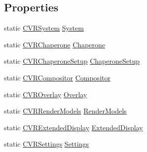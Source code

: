 \subsection*{Properties}
\begin{DoxyCompactItemize}
\item 
static \mbox{\hyperlink{class_valve_1_1_v_r_1_1_c_v_r_system}{C\+V\+R\+System}} \mbox{\hyperlink{class_valve_1_1_v_r_1_1_open_v_r_a6aafa4a25425620225098ded82a045c0}{System}}
\item 
static \mbox{\hyperlink{class_valve_1_1_v_r_1_1_c_v_r_chaperone}{C\+V\+R\+Chaperone}} \mbox{\hyperlink{class_valve_1_1_v_r_1_1_open_v_r_a28a1938fe526eed643dfc0be4d16be1e}{Chaperone}}
\item 
static \mbox{\hyperlink{class_valve_1_1_v_r_1_1_c_v_r_chaperone_setup}{C\+V\+R\+Chaperone\+Setup}} \mbox{\hyperlink{class_valve_1_1_v_r_1_1_open_v_r_aebaf4a6bd9c7d3831c0210c4af1764b4}{Chaperone\+Setup}}
\item 
static \mbox{\hyperlink{class_valve_1_1_v_r_1_1_c_v_r_compositor}{C\+V\+R\+Compositor}} \mbox{\hyperlink{class_valve_1_1_v_r_1_1_open_v_r_a398bc817d8516416f480aed933599ac5}{Compositor}}
\item 
static \mbox{\hyperlink{class_valve_1_1_v_r_1_1_c_v_r_overlay}{C\+V\+R\+Overlay}} \mbox{\hyperlink{class_valve_1_1_v_r_1_1_open_v_r_a03223e58125dbd40477879c4283728a3}{Overlay}}
\item 
static \mbox{\hyperlink{class_valve_1_1_v_r_1_1_c_v_r_render_models}{C\+V\+R\+Render\+Models}} \mbox{\hyperlink{class_valve_1_1_v_r_1_1_open_v_r_a8edbc1c20720ae5911e5e6c29221b9b5}{Render\+Models}}
\item 
static \mbox{\hyperlink{class_valve_1_1_v_r_1_1_c_v_r_extended_display}{C\+V\+R\+Extended\+Display}} \mbox{\hyperlink{class_valve_1_1_v_r_1_1_open_v_r_a227c90cd1dd0575cbaca0784a3d588ca}{Extended\+Display}}
\item 
static \mbox{\hyperlink{class_valve_1_1_v_r_1_1_c_v_r_settings}{C\+V\+R\+Settings}} \mbox{\hyperlink{class_valve_1_1_v_r_1_1_open_v_r_a4cd1c49540d981e0fba446dc8600e183}{Settings}}

\end{DoxyCompactItemize}
